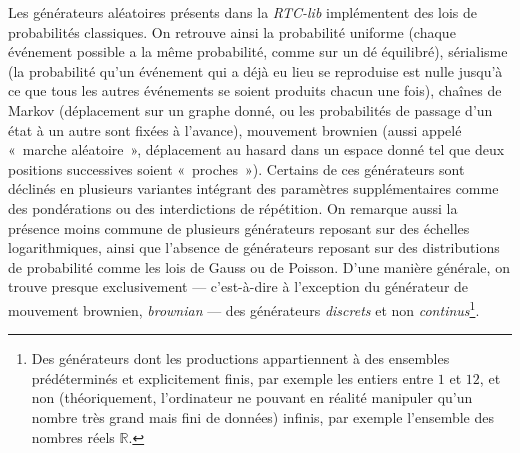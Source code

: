 \documentclass[a4paper,12pt]{article}
\newcommand{\guill}[1]{«~#1~»}
\begin{document}
Les générateurs aléatoires présents dans la \emph{RTC-lib} implémentent des lois de probabilités classiques. On retrouve ainsi la probabilité uniforme (chaque événement possible a la même probabilité, comme sur un dé équilibré), sérialisme (la probabilité qu'un événement qui a déjà eu lieu se reproduise est nulle jusqu'à ce que tous les autres événements se soient produits chacun une fois), chaînes de Markov (déplacement sur un graphe donné, ou les probabilités de passage d'un état à un autre sont fixées à l'avance), mouvement brownien (aussi appelé \guill{marche aléatoire}, déplacement au hasard dans un espace donné tel que deux positions successives soient \guill{proches}). Certains de ces générateurs sont déclinés en plusieurs variantes intégrant des paramètres supplémentaires comme des pondérations ou des interdictions de répétition. On remarque aussi la présence moins commune de plusieurs générateurs reposant sur des échelles logarithmiques, ainsi que l'absence de générateurs reposant sur des distributions de probabilité comme les lois de Gauss ou de Poisson. D'une manière générale, on trouve presque exclusivement --- c'est-à-dire à l'exception du générateur de mouvement brownien, \emph{brownian} --- des générateurs \emph{discrets} et non \emph{continus}\footnote{Des générateurs dont les productions appartiennent à des ensembles prédéterminés et explicitement finis, par exemple les entiers entre $1$ et $12$, et non (théoriquement, l'ordinateur ne pouvant en réalité manipuler qu'un nombre très grand mais fini de données) infinis, par exemple l'ensemble des nombres réels $\mathbb{R}$.}.
\end{document}
